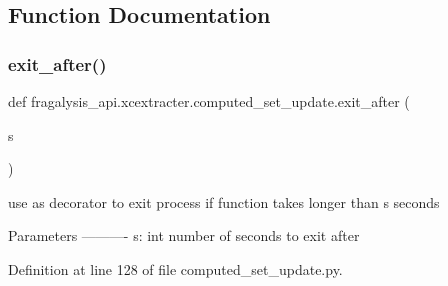 \subsection{Function Documentation}
\mbox{\label{namespacefragalysis__api_1_1xcextracter_1_1computed__set__update_ab6ecfd5eeae5a05ee20fa0d19c798f48}} 
\subsubsection{\texorpdfstring{exit\+\_\+after()}{exit\_after()}}
{\footnotesize\ttfamily def fragalysis\+\_\+api.\+xcextracter.\+computed\+\_\+set\+\_\+update.\+exit\+\_\+after (\begin{DoxyParamCaption}\item[{}]{s }\end{DoxyParamCaption})}

\begin{DoxyVerb}use as decorator to exit process if function takes longer than s seconds

Parameters
----------
s: int
    number of seconds to exit after
\end{DoxyVerb}
 

Definition at line 128 of file computed\+\_\+set\+\_\+update.\+py.


